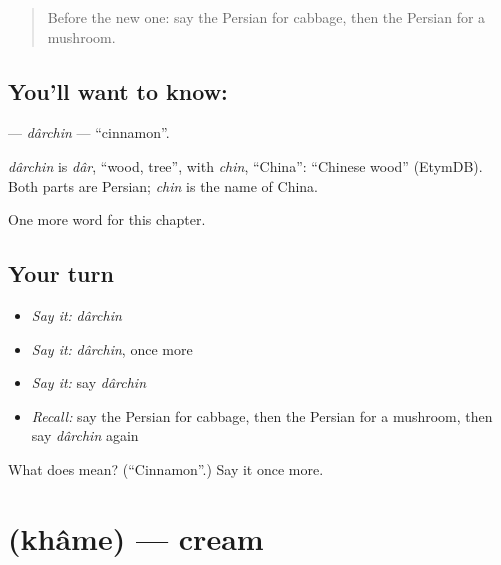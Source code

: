 \label{lesson:FA-C275-darchin}



\begin{quote}
Before the new one: say the Persian for cabbage, then the Persian for a mushroom.
\end{quote}

\subsection*{You'll want to know: }
\textbf{} — \emph{dârchin} — \textquotedblleft{}cinnamon\textquotedblright{}.

\begin{cousinweb}
\emph{dârchin} is \emph{dâr}, \textquotedblleft{}wood, tree\textquotedblright{}, with \emph{chin}, \textquotedblleft{}China\textquotedblright{}: \textquotedblleft{}Chinese wood\textquotedblright{} (EtymDB). Both parts are Persian; \emph{chin} is the name of China.
\end{cousinweb}

\begin{grammarlens}[title={What you've built}]
One more word for this chapter.
\end{grammarlens}

\subsection*{Your turn}
\begin{itemize}
\raggedright
  \item \emph{Say it:} \emph{dârchin}
  \item \emph{Say it:} \emph{dârchin}, once more
  \item \emph{Say it:} say \emph{dârchin}
  \item \emph{Recall:} say the Persian for cabbage, then the Persian for a mushroom, then say \emph{dârchin} again
\end{itemize}

\begin{tcolorbox}[breakable,colback=teal!4,colframe=teal!35!black,title={Before you move on}]
What does  mean? (\textquotedblleft{}Cinnamon\textquotedblright{}.) Say it once more.
\end{tcolorbox}
\section[\texorpdfstring{\fa{خامه} (khâme)}{خامه (khâme)}]{ (khâme) — cream}


